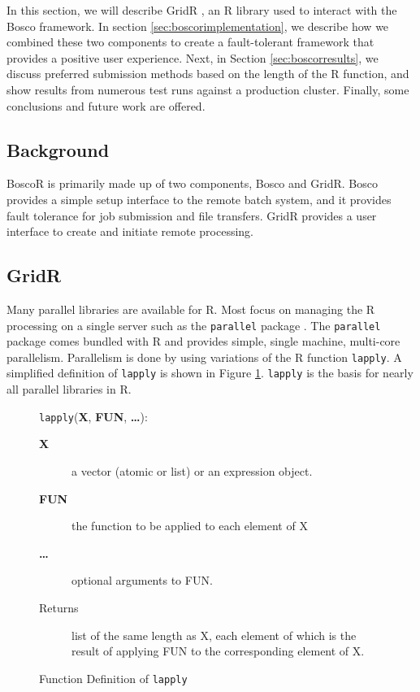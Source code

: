 In this section, we will describe GridR \cite{wegener2007gridr}, an R library used to interact with the Bosco framework.  In section \ref{sec:boscorimplementation}, we describe how we combined these two components to create a fault-tolerant framework that provides a positive user experience.  Next, in Section \ref{sec:boscorresults}, we discuss preferred submission methods based on the length of the R function, and show results from numerous test runs against a production cluster.  Finally, some conclusions and future work are offered.

\subsection{Background}
BoscoR is primarily made up of two components, Bosco and GridR.  Bosco provides a simple setup interface to the remote batch system, and it provides fault tolerance for job submission and file transfers.  GridR provides a user interface to create and initiate remote processing.


\subsection{GridR}
Many parallel libraries are available for R.  Most focus on managing the R processing on a single server such as the \texttt{parallel} package \cite{rparallelpackage}.  The \texttt{parallel} package comes bundled with R and provides simple, single machine, multi-core parallelism.  Parallelism is done by using variations of the R function \texttt{lapply}.  A simplified definition of \texttt{lapply} is shown in Figure \ref{lst:lapply}.  \texttt{lapply} is the basis for nearly all parallel libraries in R.  

\begin{figure}[h!t]
\begin{framed}
\texttt{lapply}(\textbf{X}, \textbf{FUN}, \textbf{\ldots}):
\begin{description}
\item[\textbf{X}] a vector (atomic or list) or an expression object.
\item[\textbf{FUN}] the function to be applied to each element of X
\item[\textbf{\ldots}] optional arguments to FUN.
\item[Returns] list of the same length as X, each element of which is the result of applying FUN to the corresponding element of X.
\end{description}
\end{framed}

\centering
\captionsetup{justification=centering}
\caption{Function Definition of \texttt{lapply}}
\label{lst:lapply}
\end{figure}

